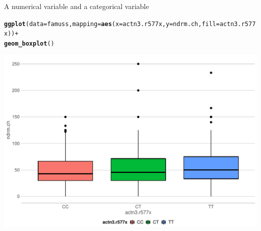 \documentclass[10pt,handout]{beamer}\usepackage[]{graphicx}\usepackage[]{color}
\makeatletter
\def\maxwidth{ %
  \ifdim\Gin@nat@width>\linewidth
    \linewidth
  \else
    \Gin@nat@width
  \fi
}
\newcommand{\hlopt}[1]{\textcolor[rgb]{0,0,0}{#1}}%
\newcommand{\hlstd}[1]{\textcolor[rgb]{0.345,0.345,0.345}{#1}}%
\newcommand{\hlkwc}[1]{\textcolor[rgb]{0.333,0.667,0.333}{#1}}%
\newcommand{\hlkwd}[1]{\textcolor[rgb]{0.737,0.353,0.396}{\textbf{#1}}}%
\newenvironment{kframe}{%
 \def\at@end@of@kframe{}%
 \ifinner\ifhmode%
  \def\at@end@of@kframe{\end{minipage}}%
  \begin{minipage}{\columnwidth}%
 \fi\fi%
 \def\FrameCommand##1{\hskip\@totalleftmargin \hskip-\fboxsep
 \colorbox{shadecolor}{##1}\hskip-\fboxsep
     \hskip-\linewidth \hskip-\@totalleftmargin \hskip\columnwidth}%
 \MakeFramed {\advance\hsize-\width
   \@totalleftmargin\z@ \linewidth\hsize
   \@setminipage}}%
 {\par\unskip\endMakeFramed%
 \at@end@of@kframe}
\newenvironment{knitrout}{}{} %
\makeatother
\begin{document}
\begin{frame}[fragile]{A numerical variable and a categorical variable}
	\protect\hypertarget{a-numerical-variable-and-a-categorical-variable-1}{}
	
	\scriptsize
	
	\scriptsize
	

	
\begin{knitrout}\scriptsize
{}\color{fgcolor}\begin{kframe}
\begin{alltt}
\hlkwd{ggplot}\hlstd{(}\hlkwc{data} \hlstd{= famuss,} \hlkwc{mapping} \hlstd{=} \hlkwd{aes}\hlstd{(}\hlkwc{x} \hlstd{= actn3.r577x,} \hlkwc{y} \hlstd{= ndrm.ch,} \hlkwc{fill} \hlstd{= actn3.r577x))} \hlopt{+}
  \hlkwd{geom_boxplot}\hlstd{()}
\end{alltt}
\end{kframe}

{\centering \includegraphics[width=\maxwidth]{figure/box-1-1} 

}


\end{knitrout}
	
	
	\normalsize
	
\end{frame}
\end{document}

